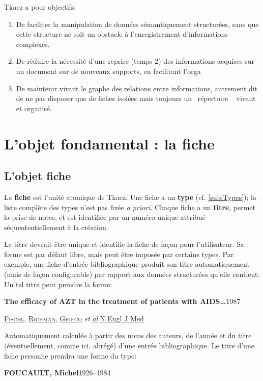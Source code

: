 \documentclass[11pt,french]{article}
\makeatletter
\providecommand{\og}{\leavevmode\flqq~}%
\providecommand{\fg}{\ifdim\lastskip>\z@\unskip\fi~\frqq}%
\newcommand\tzcard[1]{%
\begin{minipage}[t]{1\columnwidth}%
\begin{shaded}%
\sffamily #1
\end{shaded}%
\end{minipage}
}
\makeatother
\begin{document}
Tkacz a pour objectifs:
\begin{enumerate}
\item De faciliter la manipulation de données sémantiquement structurées,
sans que cette structure ne soit un obstacle à l'enregistrement d'informations
complexes.
\item De réduire la nécessité d'une reprise (temps 2) des informations acquises
sur un document sur de nouveaux supports, en facilitant l'orga
\item De maintenir vivant le graphe des relations entre informations, autrement
dit de ne pas disposer que de fiches isolées mais toujours un \og répertoire \fg{}
vivant et organisé.
\end{enumerate}

\section{L'objet fondamental : la fiche}


\subsection{L'objet fiche}

La \textbf{fiche} est l'unité atomique de Tkacz. Une fiche a un \textbf{type}
(cf. \vref{sub:Types}); la liste complète des types n'est pas fixée
\emph{a priori}. Chaque fiche a un \textbf{titre}, permet la prise
de notes, et est identifiée par un numéro unique attribué séquententiellement
à la création. 

Le titre devrait être unique et identifie la fiche de façon pour l'utilisateur.
Sa forme est par défaut libre, mais peut être imposée par certains
types. Par exemple, une fiche d'entrée bibliographique produit son
titre automatiquement (mais de façon configurable) par rapport aux
données structurées qu'elle contient. Un tel titre peut prendre la
forme:

\tzcard{\textbf{The efficacy of AZT in the treatment of patients
with AIDS…}\hfill1987

\textsc{\uline{Fischl}}\textsc{, }\textsc{\uline{Richman}}\textsc{,
}\textsc{\uline{Grieco}} \emph{et }\emph{\uline{al}}.\hfill \uline{N
Engl J Med}}

Automatiquement calculée à partir des noms des auteurs, de l'année
et du titre (éventuellement, comme ici, abrégé) d'une entrée bibliographique.
Le titre d'une fiche personne prendra une forme du type:

\tzcard{\textbf{FOUCAULT, Michel}\hfill1926--1984}
\end{document}
